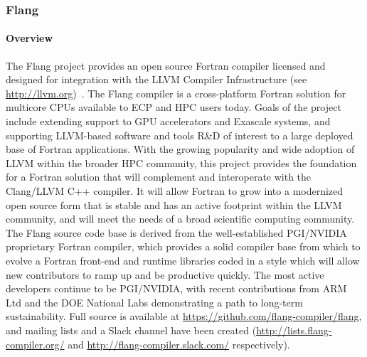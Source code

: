 \subsubsection{ Flang}\label{subsubsect:flang}

\paragraph{Overview}
The Flang project provides an open source Fortran
\cite{iso-fortran-2004} \cite{iso-fortran-2010} \cite{iso-fortran-2018}
compiler licensed and designed
for integration with the LLVM Compiler Infrastructure (see \url{http://llvm.org})~\cite{llvm:homepage}.
The Flang compiler is a cross-platform Fortran solution for multicore CPUs available
to ECP and HPC users today. Goals of the project include extending support to GPU
accelerators and Exascale systems, and supporting LLVM-based software and tools
R\&D of interest to a large deployed base of Fortran applications.  With the growing
popularity and wide adoption of LLVM within the broader HPC community, this project
provides the foundation for a Fortran solution that will complement and interoperate
with the Clang/LLVM C++ compiler.  It will allow Fortran to grow into a modernized
open source form that is stable and has an active footprint within the LLVM
community, and will meet the needs of a broad scientific computing community.  The
Flang source code base is derived from the well-established PGI/NVIDIA proprietary
Fortran compiler, which provides a solid compiler base from which to evolve a
Fortran front-end and runtime libraries coded in a style which will allow new
contributors to ramp up and be productive quickly.  The most active developers
continue to be PGI/NVIDIA, with recent contributions from ARM Ltd and the DOE
National Labs demonstrating a path to long-term sustainability.  Full source is
available at \url{https://github.com/flang-compiler/flang}, and mailing lists and a
Slack channel have been created (\url{http://lists.flang-compiler.org/} and
\url{http://flang-compiler.slack.com/} respectively).

